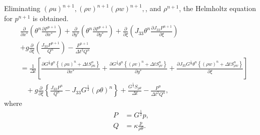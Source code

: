 Eliminating $(\rho u)^{n+1}, (\rho v)^{n+1} (\rho w)^{n+1}, $, and $\rho^{n+1}$, the Helmholtz equation for $p^{n+1}$ is obtained.
\begin{align}
  & \frac{\partial}{\partial x^*}\left(\theta^n\frac{\partial P^{n+1}}{\partial x^*}\right)
  + \frac{\partial}{\partial y^*}\left(\theta^n\frac{\partial P^{n+1}}{\partial y^*}\right)
  + \frac{\partial}{\partial \xi}\left(J_{33}\theta^n\frac{\partial J_{33}P^{n+1}}{\partial \xi}\right) \nonumber\\&
  + g \frac{\partial}{\partial \xi} \left(\frac{J_{33}P^{n+1}}{Q^n}\right)
  - \frac{P^{n+1}}{\Delta t^2 Q^n} \nonumber\\
  &=
  \frac{1}{\Delta t}\left[
      \frac{\partial G^{\frac{1}{2}}\theta^n\left\{(\rho u)^n + \Delta t S_{\rho u}^n\right\}}{\partial x^*}
    + \frac{\partial G^{\frac{1}{2}}\theta^n\left\{(\rho v)^n + \Delta t S_{\rho v}^n\right\}}{\partial y^*}
    + \frac{\partial J_{33}G^{\frac{1}{2}}\theta^n\left\{(\rho w)^n + \Delta t S_{\rho w}^n\right\}}{\partial \xi}
    \right] \nonumber\\&\;\;\;
  + g \frac{\partial}{\partial \xi}\left\{\frac{J_{33}P^n}{Q^n}-J_{33}G^{\frac{1}{2}}(\rho\theta)^n\right\}
  + \frac{G^{\frac{1}{2}} S_{\rho\theta}}{\Delta t}
  - \frac{P^n}{\Delta t^2 Q^n},
\end{align}
where
\begin{align}
  P &= G^{\frac{1}{2}}p, \\
  Q &= \kappa\frac{p}{\rho\theta}.
\end{align}


